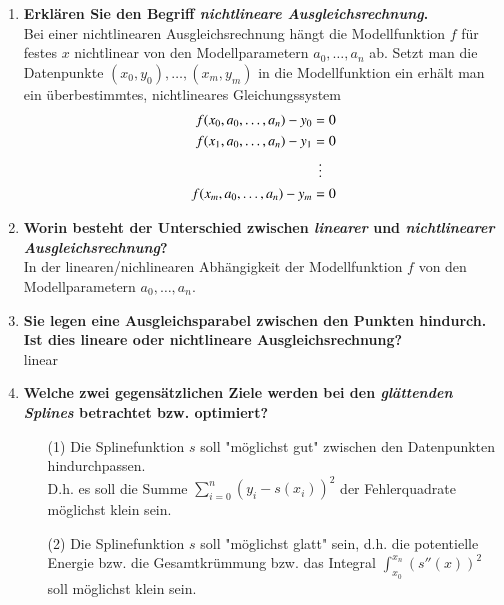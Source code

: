 \begin{enumerate}
		\item \textbf{Erklären Sie den Begriff \textit{nichtlineare Ausgleichsrechnung}.} \\
			Bei einer nichtlinearen Ausgleichsrechnung hängt die  Modellfunktion \(f\) für festes \(x\) nichtlinear von den Modellparametern \(a_0,\dots,a_n \) ab. Setzt man die Datenpunkte \((x_0,y_0),\dots,(x_m,y_m)\) in die Modellfunktion ein erhält man ein überbestimmtes, nichtlineares Gleichungssystem
			\begin{align*}
				f(x_0,a_0,\dots,a_n)-y_0 & =0     \\
				f(x_1,a_0,\dots,a_n)-y_1 & =0     \\
				                        & \hspace{0.16cm}\vdots \\
				f(x_m,a_0,\dots,a_n)-y_m & =0
			\end{align*}
		
		\item \textbf{Worin besteht der Unterschied zwischen \textit{linearer} und \textit{nichtlinearer Ausgleichsrechnung}?} \\
			In der linearen/nichlinearen Abhängigkeit der Modellfunktion \(f\) von den Modellparametern \(a_0,\dots,a_n\).
		
		\item \textbf{Sie legen eine Ausgleichsparabel zwischen den Punkten hindurch. Ist dies lineare oder	nichtlineare Ausgleichsrechnung?} \\
			linear
		
		\item \textbf{Welche zwei gegensätzlichen Ziele werden bei den \textit{glättenden Splines} betrachtet bzw. optimiert?}
			\begin{enumerate}
				\item[(1)] Die Splinefunktion \(s\) soll "möglichst gut" zwischen den Datenpunkten hindurchpassen. \\
							D.h. es soll die Summe \(\sum_{i=0}^{n}\left(y_i-s(x_i)\right)^2\) der Fehlerquadrate möglichst klein sein.
				\item[(2)] Die Splinefunktion \(s\) soll "möglichst glatt" sein, d.h. die potentielle Energie bzw. die Gesamtkrümmung bzw. das Integral \(\int_{x_0}^{x_n}\left(s''(x)\right)^2\) soll möglichst klein sein.
			\end{enumerate}
		

\end{enumerate}
